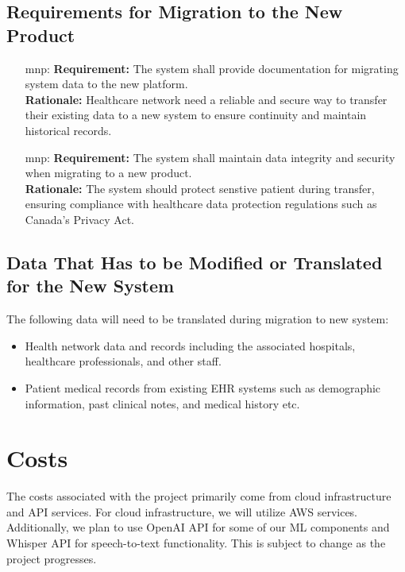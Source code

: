 \documentclass[12pt]{article}
\newcounter{mnpnum} %
\begin{document}
\subsection{Requirements for Migration to the New Product}
\begin{itemize}
  \item [mnp\refstepcounter{mnpnum}\themnpnum \label{MNP_tools}:] 
  \textbf{Requirement:} The system shall provide documentation for migrating system data to the new platform.\\
  \textbf{Rationale:} Healthcare network need a reliable and secure way to transfer their existing data to a new system to ensure continuity and maintain historical records.\\

  \item [mnp\refstepcounter{mnpnum}\themnpnum \label{MNP_security}:] 
  \textbf{Requirement:} The system shall maintain data integrity and security when migrating to a new product.\\
  \textbf{Rationale:} The system should protect senstive patient during transfer, ensuring compliance with healthcare data protection regulations such as Canada's Privacy Act.\\
\end{itemize}

\subsection{Data That Has to be Modified or Translated for the New System}
The following data will need to be translated during migration to new system: 
\begin{itemize}
  \item Health network data and records including the associated hospitals, healthcare professionals, and other staff. 
  \item Patient medical records from existing EHR systems such as demographic information, past clinical notes, and medical history etc.
\end{itemize}

\section{Costs}
The costs associated with the project primarily come from cloud infrastructure and API services. For cloud infrastructure, we will utilize AWS services. Additionally, we plan to use OpenAI API for some of our ML components and Whisper API for speech-to-text functionality. This is subject to change as the project progresses. 
\end{document}
